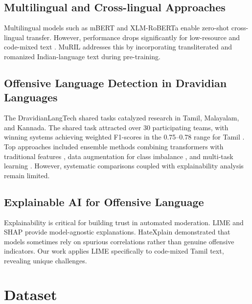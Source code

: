 \documentclass[conference]{IEEEtran}
\begin{document}
\subsection{Multilingual and Cross-lingual Approaches}

Multilingual models such as mBERT \cite{devlin2019bert} and XLM-RoBERTa \cite{conneau2020xlmr} enable zero-shot cross-lingual transfer. However, performance drops significantly for low-resource and code-mixed text \cite{pamungkas2019cross}. MuRIL \cite{khanuja2021muril} addresses this by incorporating transliterated and romanized Indian-language text during pre-training.

\subsection{Offensive Language Detection in Dravidian Languages}

The DravidianLangTech shared tasks \cite{chakravarthi2021dravidian} catalyzed research in Tamil, Malayalam, and Kannada. The shared task attracted over 30 participating teams, with winning systems achieving weighted F1-scores in the 0.75--0.78 range for Tamil \cite{chakravarthi2021dravidian}. Top approaches included ensemble methods combining transformers with traditional features \cite{dowlagar2021cfilt}, data augmentation for class imbalance \cite{risch2020data}, and multi-task learning \cite{rajamanickam2020joint}. However, systematic comparisons coupled with explainability analysis remain limited.

\subsection{Explainable AI for Offensive Language}

Explainability is critical for building trust in automated moderation. LIME \cite{ribeiro2016lime} and SHAP \cite{lundberg2017shap} provide model-agnostic explanations. HateXplain \cite{mathew2021hatexplain} demonstrated that models sometimes rely on spurious correlations rather than genuine offensive indicators. Our work applies LIME specifically to code-mixed Tamil text, revealing unique challenges.

\section{Dataset}
\end{document}
